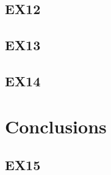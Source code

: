 \documentclass{article}
\begin{document}
	\subsection{EX12}
	
	\subsection{EX13}
	
	\subsection{EX14}
	
	\section{Conclusions}
	
	\subsection{EX15}
\end{document}
